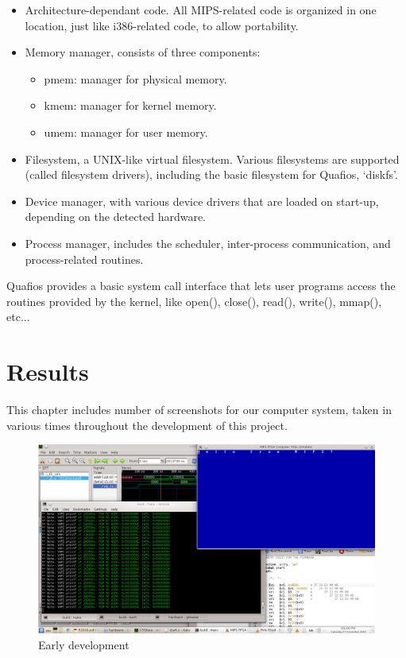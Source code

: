 \documentclass[oneside]{book}
\begin{document}
\begin{itemize}

\item Architecture-dependant code. All MIPS-related code is organized
      in one location, just like i386-related code, to allow portability.
\item Memory manager, consists of three components:
      \begin{itemize}
      \item pmem: manager for physical memory.
      \item kmem: manager for kernel memory.
      \item umem: manager for user memory.
      \end{itemize}
\item Filesystem, a UNIX-like virtual filesystem. Various filesystems
      are supported (called filesystem drivers), including the basic
      filesystem for Quafios, `diskfs'.
\item Device manager, with various device drivers that are loaded on
      start-up, depending on the detected hardware.
\item Process manager, includes the scheduler, inter-process communication,
      and process-related routines.
\end{itemize}

Quafios provides a basic system call interface that lets user programs access
the routines provided by the kernel, like open(), close(), read(), write(),
mmap(), etc...


\chapter{Results}

This chapter includes number of screenshots for our
computer system, taken in various times throughout the development of
this project.

\begin{figure}
\begin{center}
\includegraphics[width=20cm]{res_devel.png}
\end{center}
\caption{Early development}
\end{figure}
\end{document}
